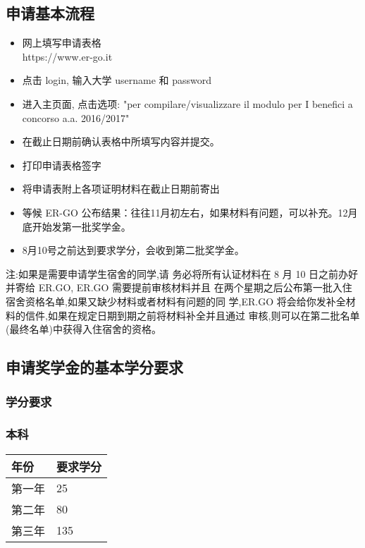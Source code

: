 \subsection{申请基本流程}
\begin{itemize}
 \item 网上填写申请表格 \\https://www.er-go.it
 \item 点击 login, 输入大学 username 和 password
 \item 进入主页面, 点击选项: "per compilare/visualizzare il modulo per I benefici a concorso a.a.
2016/2017"
 \item 在截止日期前确认表格中所填写内容并提交。
 \item 打印申请表格签字 
 \item 将申请表附上各项证明材料在截止日期前寄出 
 \item 等候 ER-GO 公布结果：往往11月初左右，如果材料有问题，可以补充。12月底开始发第一批奖学金。
 \item 8月10号之前达到要求学分，会收到第二批奖学金。
\end{itemize}
注:如果是需要申请学生宿舍的同学,请
务必将所有认证材料在 8 月 10 日之前办好并寄给 ER.GO, ER.GO 需要提前审核材料并且 在两个星期之后公布第一批入住宿舍资格名单,如果又缺少材料或者材料有问题的同 学,ER.GO 将会给你发补全材料的信件,如果在规定日期到期之前将材料补全并且通过 审核,则可以在第二批名单(最终名单)中获得入住宿舍的资格。

\subsection{申请奖学金的基本学分要求}

\subsubsection{学分要求}

\subsubsection{本科}
\begin{tabularx}{\textwidth}{ |X|X| }
  \hline
  年份 & 要求学分\\
  \hline 
  第一年  & 25  \\
  第二年  & 80  \\
  第三年  & 135  \\
  \hline
\end{tabularx}



